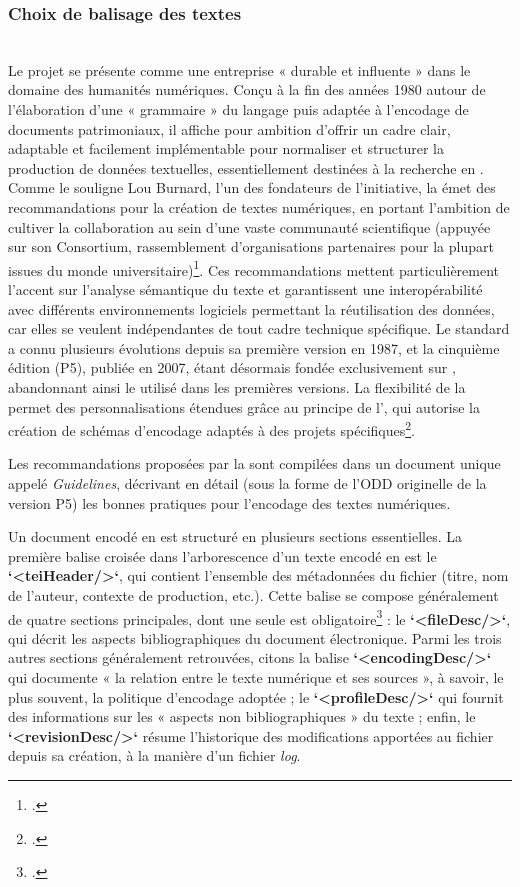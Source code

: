 \subsubsection{Choix de balisage des textes}
\newline
{}\\

Le projet \tei se présente comme une entreprise « durable et influente » dans le domaine des humanités numériques. Conçu à la fin des années 1980 autour de l’élaboration d’une « grammaire » du langage \sgml puis \xml adaptée à l’encodage de documents patrimoniaux, il affiche pour ambition d’offrir un cadre clair, adaptable et facilement implémentable pour normaliser et  structurer la production de données textuelles, essentiellement destinées à la recherche en \shs. Comme le souligne Lou Burnard, l’un des fondateurs de l’initiative, la \tei émet des recommandations pour la création de textes numériques, en portant l’ambition de cultiver la collaboration au sein d’une vaste communauté scientifique (appuyée sur son Consortium, rassemblement d’organisations partenaires pour la plupart issues du monde universitaire)\footcite{burnard_quest-ce_2015}. 
Ces recommandations mettent particulièrement l'accent sur l'analyse sémantique du texte et garantissent une interopérabilité avec différents environnements logiciels permettant la réutilisation des données, car elles se veulent indépendantes de tout cadre technique spécifique. Le standard a connu plusieurs évolutions depuis sa première version en 1987, et la cinquième édition (P5), publiée en 2007, étant désormais fondée exclusivement sur \xml, abandonnant ainsi le \sgml utilisé dans les premières versions.
La flexibilité de la \tei permet des personnalisations étendues grâce au principe de l’\odd, qui autorise la création de schémas d’encodage adaptés à des projets spécifiques\footcite{noauthor_odd_nodate}.

Les recommandations proposées par la \tei sont compilées dans un document unique appelé \textit{Guidelines}, décrivant en détail (sous la forme de l’ODD originelle de la version P5) les bonnes pratiques pour l’encodage des textes numériques. 

Un document encodé en \tei est structuré en plusieurs sections essentielles. La première balise croisée dans l’arborescence \xml d’un texte encodé en \tei est le \textbf{`<teiHeader/>`}, qui contient l’ensemble des métadonnées du fichier (titre, nom de l’auteur, contexte de production, etc.). Cette balise se compose généralement de quatre sections principales, dont une seule est obligatoire\footcite{tei_consortium_tei_2023} : le \textbf{`<fileDesc/>`}, qui décrit les aspects bibliographiques du document électronique. Parmi les trois autres sections généralement retrouvées, citons la balise \textbf{`<encodingDesc/>`} qui documente « la relation entre le texte numérique et ses sources », à savoir, le plus souvent, la politique d’encodage adoptée ; le \textbf{`<profileDesc/>`} qui fournit des informations sur les « aspects non bibliographiques » du texte ; enfin, le \textbf{`<revisionDesc/>`} résume l’historique des modifications apportées au fichier depuis sa création, à la manière d’un fichier \textit{log}. 

